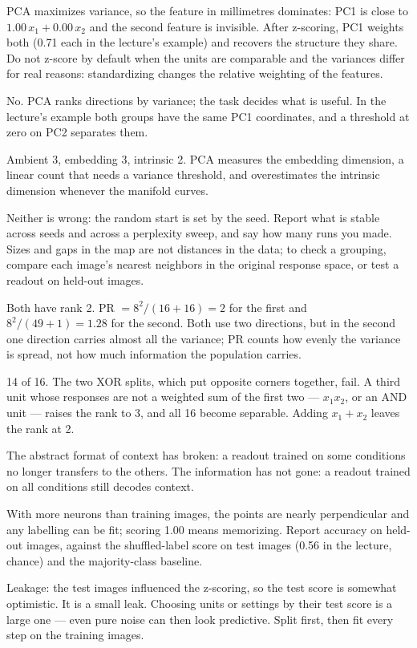 \documentclass[11pt]{article}
\begin{document}
 PCA maximizes variance, so the feature in millimetres dominates: PC1 is
close to $1.00\,x_1+0.00\,x_2$ and the second feature is invisible. After
z-scoring, PC1 weights both (0.71 each in the lecture's example) and recovers
the structure they share. Do not z-score by default when the units are
comparable and the variances differ for real reasons: standardizing changes the
relative weighting of the features.

 No. PCA ranks directions by variance; the task decides what is useful.
In the lecture's example both groups have the same PC1 coordinates, and a
threshold at zero on PC2 separates them.

 Ambient 3, embedding 3, intrinsic 2. PCA measures the embedding
dimension, a linear count that needs a variance threshold, and overestimates the
intrinsic dimension whenever the manifold curves.

 Neither is wrong: the random start is set by the seed. Report what is
stable across seeds and across a perplexity sweep, and say how many runs you
made. Sizes and gaps in the map are not distances in the data; to check a
grouping, compare each image's nearest neighbors in the original response space,
or test a readout on held-out images.

 Both have rank 2. PR $=8^2/(16+16)=2$ for the first and
$8^2/(49+1)=1.28$ for the second. Both use two directions, but in the second one
direction carries almost all the variance; PR counts how evenly the variance is
spread, not how much information the population carries.

 14 of 16. The two XOR splits, which put opposite corners together,
fail. A third unit whose responses are not a weighted sum of the first two
--- $x_1x_2$, or an AND unit --- raises the rank to 3, and all 16 become
separable. Adding $x_1+x_2$ leaves the rank at 2.

 The abstract format of context has broken: a readout trained on some
conditions no longer transfers to the others. The information has not gone:
a readout trained on all conditions still decodes context.

 With more neurons than training images, the points are nearly
perpendicular and any labelling can be fit; scoring 1.00 means memorizing.
Report accuracy on held-out images, against the shuffled-label score on test
images (0.56 in the lecture, chance) and the majority-class baseline.

 Leakage: the test images influenced the z-scoring, so the test score
is somewhat optimistic. It is a small leak. Choosing units or settings by their
test score is a large one --- even pure noise can then look predictive. Split
first, then fit every step on the training images.
\end{document}

